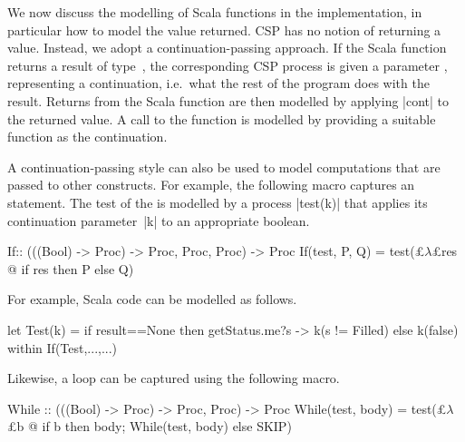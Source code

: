 We now discuss the modelling of Scala functions in the implementation, in
particular how to model the value returned.  CSP has no notion of returning a
value.  Instead, we adopt a continuation-passing approach.  If the Scala
function returns a result of type~, the corresponding CSP process is
given a parameter ,  representing a continuation,
i.e.~what the rest of the program does with the result.  Returns from the
Scala function are then modelled by applying |cont| to the returned value.  A
call to the function is modelled by providing a suitable function as the
continuation.

A continuation-passing style can also be used to model computations that are
passed to other constructs.  For example, the following macro captures an
 statement.  The test of the  is modelled by a process
|test(k)| that applies its continuation parameter~|k| to an appropriate
boolean. 
%
\begin{cspm}
If:: (((Bool) -> Proc) -> Proc, Proc, Proc) -> Proc
If(test, P, Q) = test(£$\lambda$£res @ if res then P else Q)
\end{cspm}
%
For example, Scala code  can be modelled as follows. 
%
\begin{cspm}
let Test(k) = if result==None then getStatus.me?s -> k(s != Filled) else k(false)
within If(Test,...,...)
\end{cspm}
%
Likewise, a  loop can be captured using the following macro.
%
\begin{cspm}
While :: (((Bool) -> Proc) -> Proc, Proc) -> Proc
While(test, body) = test(£$\lambda$£b @ if b then body; While(test, body) else SKIP)
\end{cspm}
